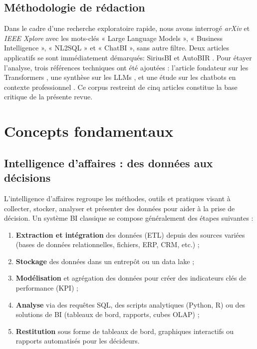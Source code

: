 \documentclass[conference]{IEEEtran}
\begin{document}
\subsection{Méthodologie de rédaction}  
Dans le cadre d’une recherche exploratoire rapide, nous avons interrogé \textit{arXiv} et \textit{IEEE Xplore} avec les mots-clés « Large Language Models », « Business Intelligence », « NL2SQL » et « ChatBI », sans autre filtre. Deux articles applicatifs se sont immédiatement démarqués: SiriusBI \citep{jiang2024siriusbi} et AutoBIR \citep{busany2024autobir}. Pour étayer l’analyse, trois références techniques ont été ajoutées : l’article fondateur sur les Transformers \citep{vaswani2023attentionneed}, une synthèse sur les LLMs \citep{minaee2025llmsurvey}, et une étude sur les chatbots en contexte professionnel \citep{toxtli2018chatbot}. Ce corpus restreint de cinq articles constitue la base critique de la présente revue. 

\section{Concepts fondamentaux}
\label{sec:concepts_fondamentaux}

\subsection{Intelligence d’affaires : des données aux décisions}

L’intelligence d’affaires regroupe les méthodes, outils et pratiques visant à collecter, stocker, analyser et présenter des données pour aider à la prise de décision. Un système BI classique se compose généralement des étapes suivantes :
\begin{enumerate}
    \item \textbf{Extraction et intégration} des données (ETL) depuis des sources variées (bases de données relationnelles, fichiers, ERP, CRM, etc.) ;
    \item \textbf{Stockage} des données dans un entrepôt ou un data lake ;
    \item \textbf{Modélisation} et agrégation des données pour créer des indicateurs clés de performance (KPI) ;
    \item \textbf{Analyse} via des requêtes SQL, des scripts analytiques (Python, R) ou des solutions de BI (tableaux de bord, rapports, cubes OLAP) ;
    \item \textbf{Restitution} sous forme de tableaux de bord, graphiques interactifs ou rapports automatisés pour les décideurs.
\end{enumerate}
\end{document}
